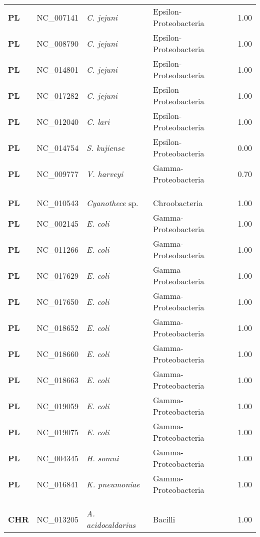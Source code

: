 \begin{adjustwidth}{-3cm}{2cm}
{\begin{supertabular}{>{\bfseries}l|p{0.1\textwidth}p{0.14\textwidth}l|l}
PL & NC\_007141 & \textit{C. jejuni} & Epsilon-Proteobacteria & 1.00\\
PL & NC\_008790 & \textit{C. jejuni} & Epsilon-Proteobacteria & 1.00\\
PL & NC\_014801 & \textit{C. jejuni} & Epsilon-Proteobacteria & 1.00\\
PL & NC\_017282 & \textit{C. jejuni} & Epsilon-Proteobacteria & 1.00\\
PL & NC\_012040 & \textit{C. lari} & Epsilon-Proteobacteria & 1.00\\
PL & NC\_014754 & \textit{S. kujiense} & Epsilon-Proteobacteria & 0.00\\
PL & NC\_009777 & \textit{V. harveyi} & Gamma-Proteobacteria & 0.70\\
\\
\\
\hline\\
PL & NC\_010543 & \textit{Cyanothece} sp. & Chroobacteria & 1.00\\
PL & NC\_002145 & \textit{E. coli} & Gamma-Proteobacteria & 1.00\\
PL & NC\_011266 & \textit{E. coli} & Gamma-Proteobacteria & 1.00\\
PL & NC\_017629 & \textit{E. coli} & Gamma-Proteobacteria & 1.00\\
PL & NC\_017650 & \textit{E. coli} & Gamma-Proteobacteria & 1.00\\
PL & NC\_018652 & \textit{E. coli} & Gamma-Proteobacteria & 1.00\\
PL & NC\_018660 & \textit{E. coli} & Gamma-Proteobacteria & 1.00\\
PL & NC\_018663 & \textit{E. coli} & Gamma-Proteobacteria & 1.00\\
PL & NC\_019059 & \textit{E. coli} & Gamma-Proteobacteria & 1.00\\
PL & NC\_019075 & \textit{E. coli} & Gamma-Proteobacteria & 1.00\\
PL & NC\_004345 & \textit{H. somni} & Gamma-Proteobacteria & 1.00\\
PL & NC\_016841 & \textit{K. pneumoniae} & Gamma-Proteobacteria & 1.00\\
\\
\\
\hline\\
CHR & NC\_013205 & \textit{A. acidocaldarius} & Bacilli & 1.00\\

\end{supertabular}}
\end{adjustwidth}
